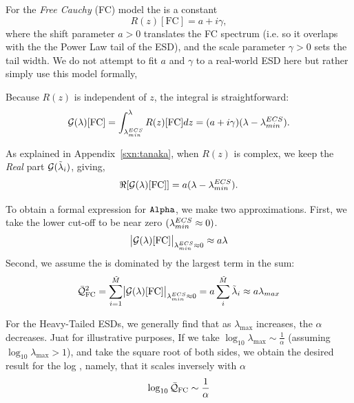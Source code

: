 For the \emph{Free Cauchy} (FC) model the \RTransform is a constant
\begin{equation}
\label{eqn:free_cauchy_R}
R(z)[\mathrm{FC}] = a + i\gamma ,
\end{equation}
where the shift parameter $a>0$ translates the FC spectrum (i.e. so it overlaps with the the Power Law tail of the ESD),
and the scale parameter $\gamma>0$ sets the tail width.
We do not attempt to fit $a$ and $\gamma$ to a real-world ESD here but rather simply use this model formally,

Because $R(z)$ is independent of $z$, the integral is straightforward:
\begin{equation}
\label{eqn:free_cauchy_G}
\mathcal{G(\lambda)}[\mathrm{FC}] = \int_{\lambda^{ECS}_{min}}^{\lambda} R(z)[\mathrm{FC}]dz = (a + i\gamma)(\lambda - \lambda^{ECS}_{min}).
\end{equation}

As explained in Appendix~\ref{sxn:tanaka}, when $R(z)$ is complex,  we keep the \emph{Real} part $\mathcal{G}(\tilde{\lambda}_{i})$, giving,
\begin{equation}
\label{eqn:free_cauchy_G_abs}
\Re[\mathcal{G(\lambda)}[\mathrm{FC}]] = a(\lambda - \lambda^{ECS}_{min}).
\end{equation}

To obtain a formal expression for $\texttt{Alpha}$, we make two approximations.
First, we take the lower cut-off to be near zero $(\lambda^{ECS}_{min} \approx 0)$.
\begin{equation}
\label{eqn:free_cauchy_G_max}
\bigl|\mathcal{G(\lambda)}[\mathrm{FC}]\bigr|_{\lambda^{ECS}_{min} \approx 0} \approx a\lambda
\end{equation}
Second, we assume the \LayerQualitySquared is dominated by the largest term in the sum:
\begin{equation}
\label{eqn:free_cauchy_G_max2}
\bar{\mathcal{Q}}^{2}_{\mathrm{FC}} = \sum_{i=1}^{\tilde{M}}\bigl|\mathcal{G(\lambda)}[\mathrm{FC}]\bigr|_{\lambda^{ECS}_{min} \approx 0}
= a\sum_{i}^{\tilde{M}} \tilde{\lambda}_{i} \approx a\lambda_{max}
\end{equation}

For the Heavy-Tailed ESDs, we generally find that as $\lambda_{\max}$ increases, the \HTSR $\alpha$ decreases.
Juat for illustrative purposes,
If we take $\log_{10}\lambda_{\max}\sim\frac{1}{\alpha}$ (assuming $\log_{10}\lambda_{\max}>1$), and take the square root of both sides,
we obtain the desired result for the log \Quality, namely, that it scales inversely with $\alpha$
\begin{equation}
\label{eqn:free_cauchy_Q}
\log_{10}\bar{\mathcal{Q}}_{\mathrm{FC}} \sim \frac{1}{\alpha}
\end{equation}

